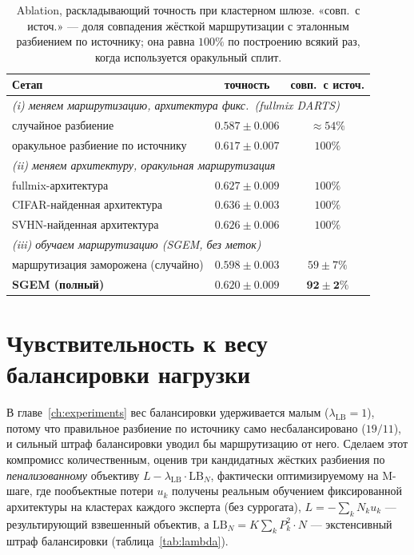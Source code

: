 \begin{table}[h]
\centering
\caption{Ablation, раскладывающий точность при кластерном шлюзе.
«совп.\ с источ.» --- доля совпадения жёсткой маршрутизации с эталонным
разбиением по источнику; она равна $100\%$ по построению всякий раз,
когда используется оракульный сплит.}
\label{tab:decomp}
\begin{tabular}{lcc}
\toprule
Сетап & точность & совп.\ с источ. \\
\midrule
\multicolumn{3}{l}{\textit{(i) меняем маршрутизацию, архитектура фикс.\ (fullmix DARTS)}} \\
\quad случайное разбиение & $0.587 \pm 0.006$ & $\approx 54\%$ \\
\quad оракульное разбиение по источнику & $0.617 \pm 0.007$ & $100\%$ \\
\midrule
\multicolumn{3}{l}{\textit{(ii) меняем архитектуру, оракульная маршрутизация}} \\
\quad fullmix-архитектура & $0.627 \pm 0.009$ & $100\%$ \\
\quad CIFAR-найденная архитектура & $0.636 \pm 0.003$ & $100\%$ \\
\quad SVHN-найденная архитектура & $0.626 \pm 0.006$ & $100\%$ \\
\midrule
\multicolumn{3}{l}{\textit{(iii) обучаем маршрутизацию (SGEM, без меток)}} \\
\quad маршрутизация заморожена (случайно) & $0.598 \pm 0.003$ & $59 \pm 7\%$ \\
\quad \textbf{SGEM (полный)} & $\mathbf{0.620 \pm 0.009}$ & $\mathbf{92 \pm 2\%}$ \\
\bottomrule
\end{tabular}
\end{table}

\section{Чувствительность к весу балансировки нагрузки}
\label{app:lambda}

В главе~\ref{ch:experiments} вес балансировки удерживается малым
($\lambda_{\text{LB}}=1$), потому что правильное разбиение по источнику
само несбалансировано ($19/11$), и сильный штраф балансировки уводил бы
маршрутизацию от него. Сделаем этот компромисс количественным, оценив
три кандидатных жёстких разбиения по \emph{пенализованному} объективу
$L - \lambda_{\text{LB}}\cdot\mathrm{LB}_N$, фактически оптимизируемому на
M-шаге, где пообъектные потери $u_k$ получены реальным обучением
фиксированной архитектуры на кластерах каждого эксперта (без суррогата),
$L = -\sum_k N_k u_k$ --- результирующий взвешенный объектив, а
$\mathrm{LB}_N = K\sum_k P_k^2\cdot N$ --- экстенсивный штраф балансировки
(таблица~\ref{tab:lambda}).

